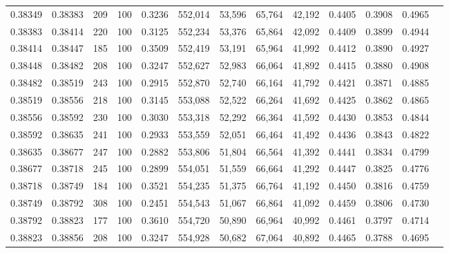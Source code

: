 \begin{tabular}{rrrrrrrrrrrrr}
0.38349 & 0.38383 &   209 & 100 &                                     0.3236 & 552,014 &  53,596 &  65,764 &  42,192 & 0.4405 & 0.3908 & 0.4965 \\
0.38383 & 0.38414 &   220 & 100 &                                     0.3125 & 552,234 &  53,376 &  65,864 &  42,092 & 0.4409 & 0.3899 & 0.4944 \\
0.38414 & 0.38447 &   185 & 100 &                                     0.3509 & 552,419 &  53,191 &  65,964 &  41,992 & 0.4412 & 0.3890 & 0.4927 \\
0.38448 & 0.38482 &   208 & 100 &                                     0.3247 & 552,627 &  52,983 &  66,064 &  41,892 & 0.4415 & 0.3880 & 0.4908 \\
0.38482 & 0.38519 &   243 & 100 &                                     0.2915 & 552,870 &  52,740 &  66,164 &  41,792 & 0.4421 & 0.3871 & 0.4885 \\
0.38519 & 0.38556 &   218 & 100 &                                     0.3145 & 553,088 &  52,522 &  66,264 &  41,692 & 0.4425 & 0.3862 & 0.4865 \\
0.38556 & 0.38592 &   230 & 100 &                                     0.3030 & 553,318 &  52,292 &  66,364 &  41,592 & 0.4430 & 0.3853 & 0.4844 \\
0.38592 & 0.38635 &   241 & 100 &                                     0.2933 & 553,559 &  52,051 &  66,464 &  41,492 & 0.4436 & 0.3843 & 0.4822 \\
0.38635 & 0.38677 &   247 & 100 &                                     0.2882 & 553,806 &  51,804 &  66,564 &  41,392 & 0.4441 & 0.3834 & 0.4799 \\
0.38677 & 0.38718 &   245 & 100 &                                     0.2899 & 554,051 &  51,559 &  66,664 &  41,292 & 0.4447 & 0.3825 & 0.4776 \\
0.38718 & 0.38749 &   184 & 100 &                                     0.3521 & 554,235 &  51,375 &  66,764 &  41,192 & 0.4450 & 0.3816 & 0.4759 \\
0.38749 & 0.38792 &   308 & 100 &                                     0.2451 & 554,543 &  51,067 &  66,864 &  41,092 & 0.4459 & 0.3806 & 0.4730 \\
0.38792 & 0.38823 &   177 & 100 &                                     0.3610 & 554,720 &  50,890 &  66,964 &  40,992 & 0.4461 & 0.3797 & 0.4714 \\
0.38823 & 0.38856 &   208 & 100 &                                     0.3247 & 554,928 &  50,682 &  67,064 &  40,892 & 0.4465 & 0.3788 & 0.4695 \\

\end{tabular}
